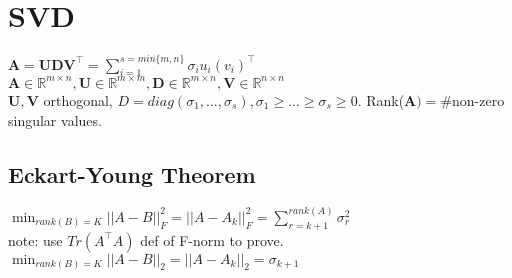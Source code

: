 \section{SVD}
$\mathbf{A} = \mathbf{U} \mathbf{D} \mathbf{V}^\top = \sum_{i=1}^{s=min\{m,n\}} \sigma_i u_i (v_i)^\top$\\
$\mathbf{A} \in \mathbb{R}^{m \times n}, \mathbf{U} \in \mathbb{R}^{m \times m}, \mathbf{D} \in \mathbb{R}^{m \times n}, \mathbf{V} \in \mathbb{R}^{n \times n}$\\
$\mathbf{U,V}$ orthogonal, $D=diag(\sigma_1,...,\sigma_s), \sigma_1 \geq ... \geq \sigma_s \geq 0$. Rank($\mathbf{A})=$\#non-zero singular values.

\subsection*{Eckart-Young Theorem}
$\min_{rank(B)=K} ||A-B||_F^2 = ||A-A_k||_F^2 = \sum_{r=k+1}^{rank(A)} \sigma_r^2$ \\
note: use $Tr(A^\top A)$ def of F-norm to prove.
$\min_{rank(B)=K} ||A-B||_2 = ||A-A_k||_2 = \sigma_{k+1}$
